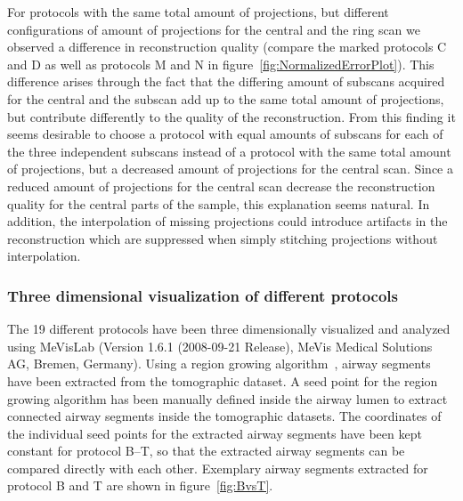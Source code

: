 For protocols with the same total amount of projections, but different configurations of amount of projections for the central and the ring scan we observed a difference in reconstruction quality (compare the marked protocols C and D as well as protocols M and N in figure~\ref{fig:NormalizedErrorPlot}). This difference arises through the fact that the differing amount of subscans acquired for the central and the subscan add up to the same total amount of projections, but contribute differently to the quality of the reconstruction. From this finding it seems desirable to choose a protocol with equal amounts of subscans for each of the three independent subscans instead of a protocol with the same total amount of projections, but a decreased amount of projections for the central scan. Since a reduced amount of projections for the central scan decrease the reconstruction quality for the central parts of the sample, this explanation seems natural. In addition, the interpolation of missing projections could introduce artifacts in the reconstruction which are suppressed when simply stitching projections without interpolation.

\subsubsection{Three dimensional visualization of different protocols}%
\label{subsec:comparison}%
The 19 different protocols have been three dimensionally visualized and analyzed using MeVisLab (Version 1.6.1 (2008-09-21 Release), MeVis Medical Solutions AG, Bremen, Germany). Using a region growing algorithm~\cite{wiki:regiongrowing}, airway segments have been extracted from the tomographic dataset.  A seed point for the region growing algorithm has been manually defined inside the airway lumen to extract connected airway segments inside the tomographic datasets. The coordinates of the individual seed points for the extracted airway segments have been kept constant for protocol B--T, so that the extracted airway segments can be compared directly with each other. Exemplary airway segments extracted for protocol B and T are shown in figure~\ref{fig:BvsT}.

